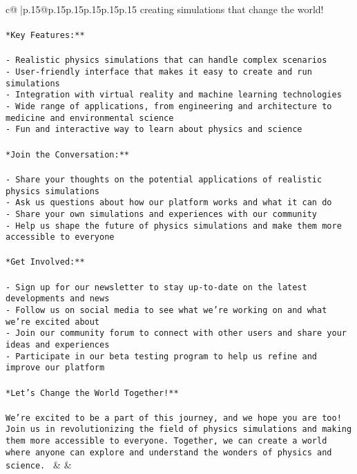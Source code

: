 \documentclass{article}
\begin{document}
{\begin{supertabular}{c@{$\;$}|p{.15\linewidth}@{}p{.15\linewidth}p{.15\linewidth}p{.15\linewidth}p{.15\linewidth}p{.15\linewidth}}
{{{creating simulations that change the world!\\ \tt \\ \tt **Key Features:**\\ \tt \\ \tt - Realistic physics simulations that can handle complex scenarios\\ \tt - User-friendly interface that makes it easy to create and run simulations\\ \tt - Integration with virtual reality and machine learning technologies\\ \tt - Wide range of applications, from engineering and architecture to medicine and environmental science\\ \tt - Fun and interactive way to learn about physics and science\\ \tt \\ \tt **Join the Conversation:**\\ \tt \\ \tt - Share your thoughts on the potential applications of realistic physics simulations\\ \tt - Ask us questions about how our platform works and what it can do\\ \tt - Share your own simulations and experiences with our community\\ \tt - Help us shape the future of physics simulations and make them more accessible to everyone\\ \tt \\ \tt **Get Involved:**\\ \tt \\ \tt - Sign up for our newsletter to stay up-to-date on the latest developments and news\\ \tt - Follow us on social media to see what we're working on and what we're excited about\\ \tt - Join our community forum to connect with other users and share your ideas and experiences\\ \tt - Participate in our beta testing program to help us refine and improve our platform\\ \tt \\ \tt **Let's Change the World Together!**\\ \tt \\ \tt We're excited to be a part of this journey, and we hope you are too! Join us in revolutionizing the field of physics simulations and making them more accessible to everyone. Together, we can create a world where anyone can explore and understand the wonders of physics and science. 
	  } 
	   } 
	   } 
	 & & \\ 
 


\end{supertabular}}
\end{document}
